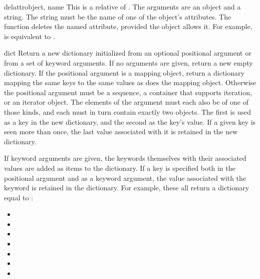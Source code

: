 \begin{funcdesc}{delattr}{object, name}
  This is a relative of .  The arguments are an
  object and a string.  The string must be the name
  of one of the object's attributes.  The function deletes
  the named attribute, provided the object allows it.  For example,
   is equivalent to
  .
\end{funcdesc}

\begin{funcdesc}{dict}{}
  Return a new dictionary initialized from an optional positional
  argument or from a set of keyword arguments.
  If no arguments are given, return a new empty dictionary.
  If the positional argument  is a mapping object, return a dictionary
  mapping the same keys to the same values as does the mapping object.
  Otherwise the positional argument must be a sequence, a container that
  supports iteration, or an iterator object.  The elements of the argument
  must each also be of one of those kinds, and each must in turn contain
  exactly two objects.  The first is used as a key in the new dictionary,
  and the second as the key's value.  If a given key is seen more than
  once, the last value associated with it is retained in the new
  dictionary.

  If keyword arguments are given, the keywords themselves with their
  associated values are added as items to the dictionary. If a key
  is specified both in the positional argument and as a keyword argument,
  the value associated with the keyword is retained in the dictionary.
  For example, these all return a dictionary equal to
  :

  \begin{itemize}
    \item {}
    \item {}
    \item {}
    \item {}
    \item {}
    \item {}
    \item {}
  \end{itemize}

\end{funcdesc}


